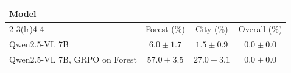 \begin{center}
\begin{tabular}{lccc}
\toprule
\multirow{2}{*}{Model} & \multicolumn{2}{c}{\challenge{}} & {\hardchallenge{}} \\
\cmidrule(lr){2-3}\cmidrule(lr){4-4}
  & Forest (\%) & City (\%) & Overall (\%)\\
\midrule
Qwen2.5-VL 7B & $ 6.0 \pm 1.7 $ & $ 1.5 \pm 0.9 $ & $0.0 \pm 0.0$ \\
Qwen2.5-VL 7B, GRPO on Forest  & \color{gray}$ 57.0 \pm 3.5 $ & $ 27.0 \pm 3.1 $ & $ 0.0 \pm 0.0 $ \\
\bottomrule
\end{tabular}
\end{center}
